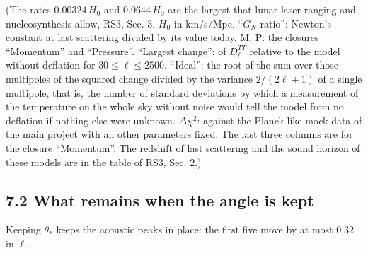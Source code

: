 \documentclass[
  10pt,
]{article}
\begin{document}
(The rates \(0.00324\,H_0\) and \(0.0644\,H_0\) are the largest that
lunar laser ranging and nucleosynthesis allow, RS3, Sec. 3. \(H_0\) in
km/s/Mpc. ``\(G_N\) ratio'': Newton's constant at last scattering
divided by its value today. M, P: the closures ``Momentum'' and
``Pressure''. ``Largest change'': of \(D_\ell^{TT}\) relative to the
model without deflation for \(30\le\ell\le2500\). ``Ideal'': the root of
the sum over those multipoles of the squared change divided by the
variance \(2/(2\ell+1)\) of a single multipole, that is, the number of
standard deviations by which a measurement of the temperature on the
whole sky without noise would tell the model from no deflation if
nothing else were unknown. \(\Delta\chi^2\): against the Planck-like
mock data of the main project with all other parameters fixed. The last
three columns are for the closure ``Momentum''. The redshift of last
scattering and the sound horizon of these models are in the table of
RS3, Sec. 2.)

\hypertarget{what-remains-when-the-angle-is-kept}{%
\subsection{7.2 What remains when the angle is
kept}\label{what-remains-when-the-angle-is-kept}}

Keeping \(\theta_*\) keeps the acoustic peaks in place: the first five
move by at most 0.32 in \(\ell\).
\end{document}
